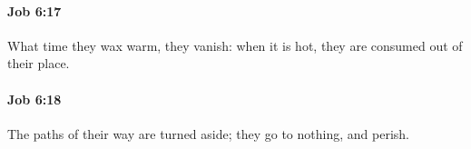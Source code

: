 		\paragraph{Job 6:17} %
			\label{JOB-6-17}

			What time they wax warm, they vanish: when it is hot, they are consumed out of their place.


		\paragraph{Job 6:18} %
			\label{JOB-6-18}

			The paths of their way are turned aside; they go to nothing, and perish.


